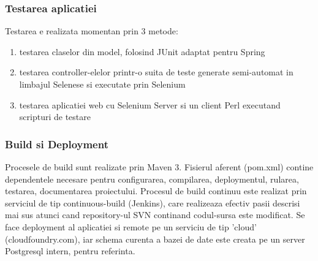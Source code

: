 \subsubsection{Testarea aplicatiei}
Testarea e realizata momentan prin 3 metode:
\begin{enumerate}
  \item testarea claselor din model, folosind JUnit adaptat pentru Spring
  \item testarea controller-elelor printr-o suita de teste generate semi-automat
  in limbajul Selenese si executate prin Selenium
  \item testarea aplicatiei web cu Selenium Server si un client Perl executand
  scripturi de testare
\end{enumerate}

\subsubsection{Build si Deployment}
Procesele de build sunt realizate prin Maven 3. Fisierul aferent (pom.xml)
contine dependentele necesare pentru configurarea, compilarea,
deploymentul, rularea, testarea, documentarea proiectului.
Procesul de build continuu este realizat prin 
serviciul de tip continuous-build (Jenkins), 
care realizeaza efectiv pasii descrisi mai sus 
atunci cand repository-ul SVN continand codul-sursa este modificat. 
Se face deployment al aplicatiei si remote pe un
serviciu de tip 'cloud' (cloudfoundry.com), 
iar schema curenta a bazei de date este creata pe un server Postgresql intern,
pentru referinta.
